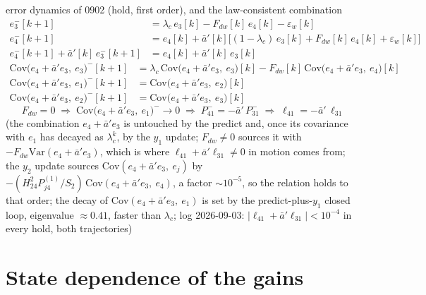 \documentclass[11pt,a4paper,fontset=none]{ctexart}
\newcommand{\ba}{\bar{a}}
\begin{document}
error dynamics of 0902 (hold, first order), and the law-consistent combination
\begin{align*}
e_3^{-}[k+1] &= \lambda_c\,e_3[k] - F_{dw}[k]\,e_4[k] - \varepsilon_w[k] \\
e_4^{-}[k+1] &= e_4[k] + \ba'[k]\bigl[(1-\lambda_c)\,e_3[k] + F_{dw}[k]\,e_4[k] + \varepsilon_w[k]\bigr] \\
e_4^{-}[k+1] + \ba'[k]\,e_3^{-}[k+1] &= e_4[k] + \ba'[k]\,e_3[k]
\end{align*}
\begin{align*}
\mathrm{Cov}\bigl(e_4 + \ba' e_3,\ e_3\bigr)^{-}[k+1] &= \lambda_c\,\mathrm{Cov}\bigl(e_4 + \ba' e_3,\ e_3\bigr)[k]
   - F_{dw}[k]\,\mathrm{Cov}\bigl(e_4 + \ba' e_3,\ e_4\bigr)[k] \\
\mathrm{Cov}\bigl(e_4 + \ba' e_3,\ e_1\bigr)^{-}[k+1] &= \mathrm{Cov}\bigl(e_4 + \ba' e_3,\ e_2\bigr)[k] \\
\mathrm{Cov}\bigl(e_4 + \ba' e_3,\ e_2\bigr)^{-}[k+1] &= \mathrm{Cov}\bigl(e_4 + \ba' e_3,\ e_3\bigr)[k]
\end{align*}
\begin{equation*}
F_{dw} = 0 \;\Rightarrow\; \mathrm{Cov}\bigl(e_4 + \ba' e_3,\ e_1\bigr)^{-} \to 0 \;\Rightarrow\;
P^{-}_{41} = -\ba'\,P^{-}_{31} \;\Rightarrow\; \ell_{41} = -\ba'\,\ell_{31}
\end{equation*}
(the combination $e_4 + \ba' e_3$ is untouched by the predict and, once its covariance with $e_1$ has
decayed as $\lambda_c^{k}$, by the $y_1$ update; $F_{dw} \neq 0$ sources it with
$-F_{dw}\mathrm{Var}(e_4 + \ba' e_3)$, which is where $\ell_{41} + \ba'\ell_{31} \neq 0$ in motion comes from;
the $y_2$ update sources $\mathrm{Cov}(e_4 + \ba' e_3,\ e_j)$ by $-(H_{24}^{2}P^{(1)}_{j4}/S_2)\,\mathrm{Cov}(e_4 + \ba' e_3,\ e_4)$,
a factor $\sim 10^{-5}$, so the relation holds to that order; the decay of $\mathrm{Cov}(e_4 + \ba' e_3,\ e_1)$ is set by the
predict-plus-$y_1$ closed loop, eigenvalue $\approx 0.41$, faster than $\lambda_c$;
log 2026-09-03: $|\ell_{41} + \ba'\ell_{31}| < 10^{-4}$ in every hold, both trajectories)

\section{State dependence of the gains}
\end{document}
